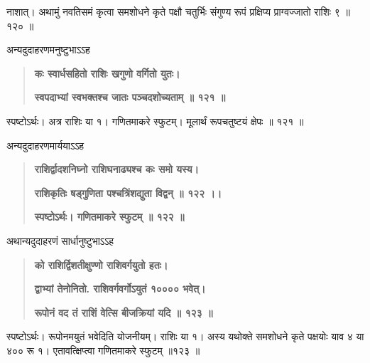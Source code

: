 \documentclass[11pt, openany]{book}
\begin{document}
\begin{sloppypar}
\hangindent=0.2in नाशात्। अथामुं नवतिसमं कृत्वा समशोधने कृते पक्षौ चतुर्भिः संगुण्य रूपं प्रक्षिप्य प्राग्वज्जातो राशिः ९ ॥ १२० ॥

\hangindent=0.2in \hspace{0.2in}अन्यदुदाहरणमनुष्टुभाऽऽह\textendash

\begin{quote}
\hspace{1in}\textbf{कः स्वार्धसहितो राशिः खगुणो वर्गितो युतः।}

\hspace{1in}\textbf{स्वपदाभ्यां स्वभक्तश्च जातः पञ्चदशोच्यताम् ॥ १२१ ॥}
\end{quote}

\hangindent=0.2in \hspace{0.2in}स्पष्टोऽर्थः। अत्र राशिः या १। गणितमाकरे स्फुटम्। मूलार्थं रूपचतुष्टयं क्षेपः ॥ १२१ ॥

\hangindent=0.2in \hspace{0.2in}अन्यदुदाहरणमार्ययाऽऽह\textendash

\begin{quote}
\hspace{1in}\textbf{राशिर्द्वादशनिघ्नो राशिघनाढ्यश्च कः समो यस्य।}

\hspace{1in}\textbf{राशिकृतिः षड्गुणिता पश्चत्रिंशद्युता विद्वन् ॥ १२२ ।।}

\hspace{1in}\textbf{स्पष्टोऽर्थः। गणितमाकरे स्फुटम् ॥ १२२ ॥}
\end{quote}

\hangindent=0.2in \hspace{0.2in}अथान्यदुदाहरणं सार्धानुष्टुभाऽऽह\textendash

\begin{quote}
\hspace{1in}\textbf{को राशिर्द्विशतीक्षुण्णो राशिवर्गयुतो हतः।}

\hspace{1in}\textbf{द्वाभ्यां तेनोनितो. राशिवर्गवर्गोऽयुतं १०००० भवेत्।}

\hspace{1in}\textbf{रूपोनं वद तं राशिं वेत्सि बीजक्रियां यदि ॥ १२३ ॥}
\end{quote}

\hangindent=0.2in \hspace{0.2in}स्पष्टोऽर्थः। रूपोनमयुतं भवेदिति योजनीयम्। राशिः या १। अस्य यथोक्ते समशोधने कृते पक्षयोः याव ४ या ४०० रू १। एतावत्क्षिप्त्वा गणितमाकरे स्फुटम् ॥१२३ ॥


\end{sloppypar}
\end{document}

